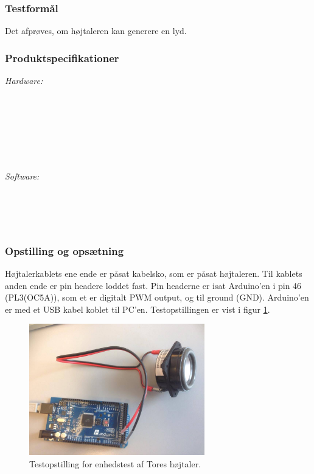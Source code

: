 		\subsubsection{Testformål}
		Det afprøves, om højtaleren kan generere en lyd.
		\subsubsection{Produktspecifikationer}
	
	
		\textit{Hardware:}\\
		\tores\\
		\\
		\kabelsko\\
		\pins\\
		\arduino\\
		\PC\\
		\usbkabel\\
	
		\textit{Software:}\\
		\labview\\
		\visa\\
		\vi\\
		\ardsw\
	
		\subsubsection{Opstilling og opsætning}
		Højtalerkablets ene ende er påsat kabelsko, som er påsat højtaleren. Til kablets anden ende er pin headere loddet fast. Pin headerne er isat Arduino'en i pin 46 (PL3(OC5A)), som et er digitalt PWM output, og til ground (GND). 
		Arduino'en er med et USB kabel koblet til PC'en. Testopstillingen er vist i figur \ref{fig:ethb}.\\ 
	  
			\begin{figure}[htb]
			\centering
				\includegraphics[width=3in]{hbArduino}
				\caption{Testopstilling for enhedstest af Tores højtaler.}	
				\label{fig:ethb}
			\end{figure}
	
